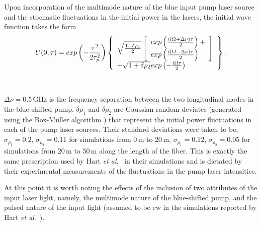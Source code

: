 Upon incorporation of the multimode nature of the blue input pump laser source
and the stochastic fluctuations in the initial power in the lasers, the
initial wave function takes the form
\begin{equation}
U(0,\tau) = exp\left( - {\tau^2 \over 2\tau_p^2} \right)
\left\{
\begin{array}{l}
\sqrt{{1 + \delta\rho_1 \over 2}}
\left[ \begin{array}{l}
exp \left( {i(\Omega+\Delta\nu)\tau \over 2} \right) + \\
exp \left( {i(\Omega-\Delta\nu)\tau \over 2} \right)
\end{array} \right]\\
+ \sqrt{1 + \delta\rho_2} exp\left( - {i\Omega\tau \over 2} \right)
\end{array}
\right\}.
\end{equation}

\

\noindent $\Delta\nu = 0.5$\,GHz is the frequency separation between the two longitudinal
modes in the blue-shifted pump. $\delta\rho_1$ and $\delta\rho_2$ are
Gaussian random deviates (generated using the Box-Muller algorithm
\cite{boxmuller}) that represent the initial power fluctuations in each of the
pump laser sources. Their standard deviations were taken to be,
$\sigma_{\rho_1} = 0.2$, $\sigma_{\rho_2} = 0.11$ for simulations from 0\,m to
20\,m, $\sigma_{\rho_1} = 0.12$, $\sigma_{\rho_2} = 0.05$ for simulations from
20\,m to 50\,m along the length of the fiber. This is exactly the same
prescription used by Hart {\it et al}.\ \cite{hart1} in their simulations and is
dictated by their experimental measurements of the fluctuations in the pump
laser intensities.

At this point it is worth noting the effects of the inclusion of two attributes of
the input laser light, namely, the multimode nature of the blue-shifted pump, and
the pulsed nature of the input light (assumed to be cw in the simulations reported by
Hart {\it et al}.\ \cite{hart1}).

